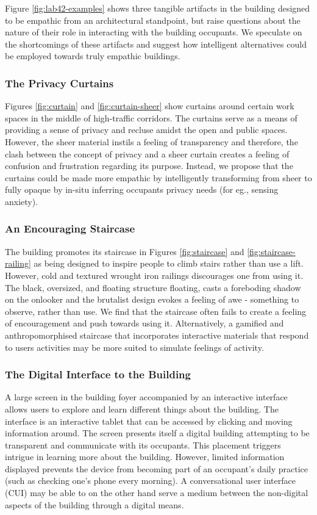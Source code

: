 \documentclass[manuscript, anonymous, review]{acmart}
\begin{document}
Figure \ref{fig:lab42-examples} shows three tangible artifacts in the building designed to be empathic from an architectural standpoint, but raise questions about the nature of their role in interacting with the building occupants. We speculate on the shortcomings of these artifacts and suggest how intelligent  alternatives could be employed towards truly empathic buildings.

\subsubsection*{The Privacy Curtains}
Figures \ref{fig:curtain} and \ref{fig:curtain-sheer} show curtains around certain work spaces in the middle of high-traffic corridors. The curtains serve as a means of providing a sense of privacy and recluse amidst the open and public spaces. However, the sheer material instils a feeling of transparency and therefore, the clash between the concept of privacy and a sheer curtain creates a feeling of confusion and frustration regarding its purpose. Instead, we propose that the curtains could be made  more empathic by intelligently transforming from sheer to fully opaque by in-situ inferring occupants privacy needs (for eg., sensing anxiety).  

\subsubsection*{An Encouraging Staircase}
The building promotes its staircase in Figures \ref{fig:staircase} and \ref{fig:staircase-railing} as being designed to inspire people to climb stairs rather than use a lift. However, cold and textured wrought iron railings discourages one from using it. The black, oversized, and floating structure floating, casts a foreboding  shadow on the onlooker  and the brutalist design evokes a feeling of awe - something to observe, rather than use. We find that the staircase often fails to create a feeling of encouragement and push towards using it. Alternatively, a gamified and anthropomorphised staircase that incorporates interactive materials that respond to users activities may be more suited to simulate feelings of activity. 

\subsubsection*{The Digital Interface to the Building}
A large screen in the building foyer accompanied by an interactive interface allows users to explore and learn different things about the building. The interface is an interactive tablet that can be accessed by clicking and moving information around. The screen presents itself a digital building attempting to be transparent and communicate with its occupants. This placement triggers intrigue in learning more about the building. However, limited information displayed prevents the device from becoming part of an occupant's daily practice (such as checking one's phone every morning). A conversational user interface (CUI) may be able to on the other hand serve a medium between the non-digital aspects of the building through a digital means. 
\end{document}

